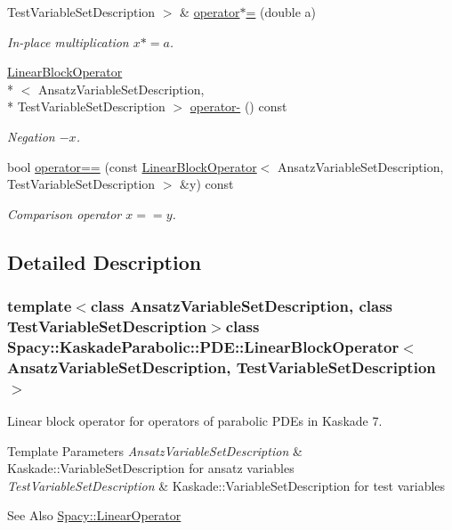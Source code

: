 \begin{DoxyCompactItemize}
Test\-Variable\-Set\-Description $>$ \& \hyperlink{classSpacy_1_1AddArithmeticOperators_a1d3db95b24fd2bc1de712c9e04c47e2f}{operator$\ast$=} (double a)
\begin{DoxyCompactList}\small\item\em In-\/place multiplication $ x*=a$. \end{DoxyCompactList}\item 
\hyperlink{classSpacy_1_1KaskadeParabolic_1_1PDE_1_1LinearBlockOperator}{Linear\-Block\-Operator}\\*
$<$ Ansatz\-Variable\-Set\-Description, \\*
Test\-Variable\-Set\-Description $>$ \hyperlink{classSpacy_1_1AddArithmeticOperators_a5acd030bf265d130983fd6e3c5b68be5}{operator-\/} () const
\begin{DoxyCompactList}\small\item\em Negation $ -x$. \end{DoxyCompactList}\item 
bool \hyperlink{classSpacy_1_1AddArithmeticOperators_a5ff1909f49f4a705d69663dc2d4b6316}{operator==} (const \hyperlink{classSpacy_1_1KaskadeParabolic_1_1PDE_1_1LinearBlockOperator}{Linear\-Block\-Operator}$<$ Ansatz\-Variable\-Set\-Description, Test\-Variable\-Set\-Description $>$ \&y) const
\begin{DoxyCompactList}\small\item\em Comparison operator $ x==y$. \end{DoxyCompactList}\end{DoxyCompactItemize}


\subsection{Detailed Description}
\subsubsection*{template$<$class Ansatz\-Variable\-Set\-Description, class Test\-Variable\-Set\-Description$>$class Spacy\-::\-Kaskade\-Parabolic\-::\-P\-D\-E\-::\-Linear\-Block\-Operator$<$ Ansatz\-Variable\-Set\-Description, Test\-Variable\-Set\-Description $>$}

Linear block operator for operators of parabolic P\-D\-Es in Kaskade 7. 


\begin{DoxyTemplParams}{Template Parameters}
{\em Ansatz\-Variable\-Set\-Description} & Kaskade\-::\-Variable\-Set\-Description for ansatz variables \\
\hline
{\em Test\-Variable\-Set\-Description} & Kaskade\-::\-Variable\-Set\-Description for test variables \\
\hline
\end{DoxyTemplParams}
\begin{DoxySeeAlso}{See Also}
\hyperlink{classSpacy_1_1LinearOperator}{Spacy\-::\-Linear\-Operator} 
\end{DoxySeeAlso}


